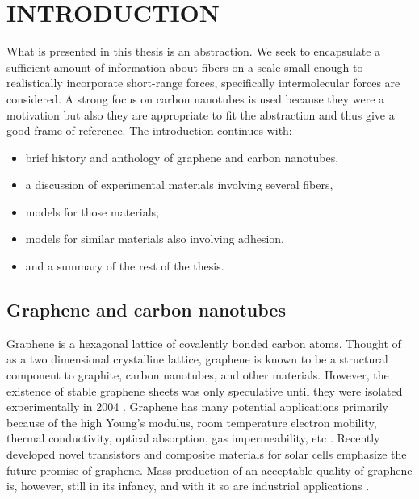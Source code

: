 \chapter{INTRODUCTION} \label{chap:one}

	What is presented in this thesis is an abstraction. We seek to encapsulate a sufficient amount of information about fibers on a scale small enough to realistically incorporate short-range forces, specifically intermolecular forces are considered. A strong focus on carbon nanotubes is used because they were a motivation but also they are appropriate to fit the abstraction and thus give a good frame of reference. The introduction continues with:

\begin{itemize}	
	\item {
		brief history and anthology of graphene and carbon nanotubes, 
	}
	\item {
		a discussion of experimental materials involving several fibers,
	}
	\item {
		models for those materials,
	}
	\item {
		models for similar materials also involving adhesion,
	}
	\item {
		and a summary of the rest of the thesis.
	}
\end{itemize}



\section{Graphene and carbon nanotubes}
	
	Graphene is a hexagonal lattice of covalently bonded carbon atoms. Thought of as a two dimensional crystalline lattice, graphene is known to be a structural component to graphite, carbon nanotubes, and other materials. However, the existence of stable graphene sheets was only speculative until they were isolated experimentally in 2004 \cite{Novoselov2004}. Graphene has many potential applications primarily because of the high Young's modulus, room temperature electron mobility, thermal conductivity, optical absorption, gas impermeability, etc \cite{Novoselov2012}. Recently developed novel transistors \cite{Lin2010} and composite materials for solar cells \cite{Wang2013} emphasize the future promise of graphene. Mass production of an acceptable quality of graphene is, however, still in its infancy, and with it so are industrial applications \cite{Novoselov2012}.
	
